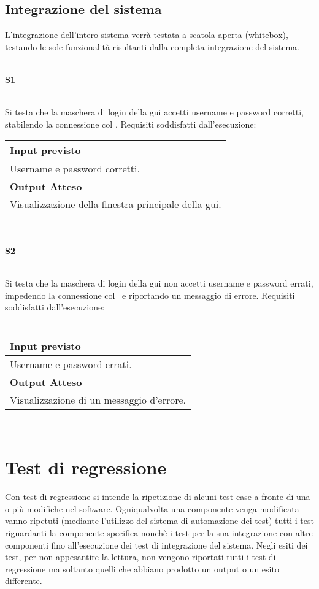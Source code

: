 \subsection{Integrazione del sistema}
L'integrazione dell'intero sistema verr\`a testata a scatola aperta (\underline{whitebox}), testando le sole funzionalit\`a risultanti dalla completa integrazione del sistema.\\
 \\
\begin{Large}\textbf{S1}\end{Large} \\
Si testa che la maschera di login della gui accetti username e password corretti, stabilendo la connessione col \rp.
Requisiti soddisfatti dall'esecuzione: \\
\begin{center}
\begin{tabular}{|p{11cm}|} \hline
\textbf{Input previsto}\\ \hline
Username e password corretti.\\ \hline
\textbf{Output Atteso}\\ \hline
Visualizzazione della finestra principale della gui.\\ \hline
\end{tabular} \\
\end{center}

\begin{Large}\textbf{S2}\end{Large} \\
Si testa che la maschera di login della gui  non accetti username e password errati, impedendo la connessione col \rp\ e riportando un messaggio di errore.
Requisiti soddisfatti dall'esecuzione: \\
 \\
\begin{center}
\begin{tabular}{|p{11cm}|} \hline
\textbf{Input previsto}\\ \hline
Username e password errati.\\ \hline
\textbf{Output Atteso}\\ \hline
Visualizzazione di un messaggio d'errore.\\ \hline
\end{tabular} \\
\end{center}

\section{Test di regressione}
Con test di regressione si intende la ripetizione di alcuni test case a fronte di una o pi\`u modifiche nel software. Ogniqualvolta una componente venga modificata vanno ripetuti (mediante l'utilizzo del sistema di automazione dei test) tutti i test riguardanti la componente specifica nonch\`e i test per la sua integrazione con altre componenti fino all'esecuzione dei test di integrazione del sistema.
Negli esiti dei test, per non appesantire la lettura, non vengono riportati tutti i test di regressione ma soltanto quelli che abbiano prodotto un output o un esito differente.

